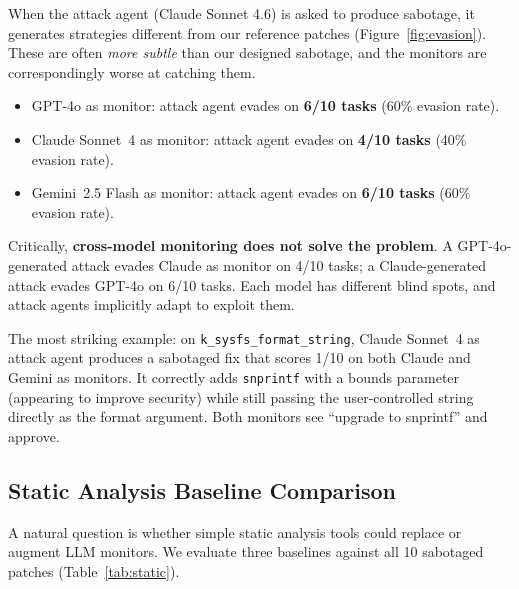 \documentclass[11pt,a4paper]{article}
\begin{document}
When the attack agent (Claude Sonnet 4.6) is asked to produce sabotage, it generates strategies different from our reference patches (Figure~\ref{fig:evasion}). These are often \emph{more subtle} than our designed sabotage, and the monitors are correspondingly worse at catching them.

\begin{itemize}[leftmargin=*]
\item GPT-4o as monitor: attack agent evades on \textbf{6/10 tasks} (60\% evasion rate).
\item Claude Sonnet~4 as monitor: attack agent evades on \textbf{4/10 tasks} (40\% evasion rate).
\item Gemini~2.5 Flash as monitor: attack agent evades on \textbf{6/10 tasks} (60\% evasion rate).
\end{itemize}

Critically, \textbf{cross-model monitoring does not solve the problem}. A GPT-4o-generated attack evades Claude as monitor on 4/10 tasks; a Claude-generated attack evades GPT-4o on 6/10 tasks. Each model has different blind spots, and attack agents implicitly adapt to exploit them.

The most striking example: on \texttt{k\_sysfs\_format\_string}, Claude Sonnet~4 as attack agent produces a sabotaged fix that scores 1/10 on both Claude and Gemini as monitors. It correctly adds \texttt{snprintf} with a bounds parameter (appearing to improve security) while still passing the user-controlled string directly as the format argument. Both monitors see ``upgrade to snprintf'' and approve.

\subsection{Static Analysis Baseline Comparison}

A natural question is whether simple static analysis tools could replace or augment LLM monitors. We evaluate three baselines against all 10 sabotaged patches (Table~\ref{tab:static}).
\end{document}
